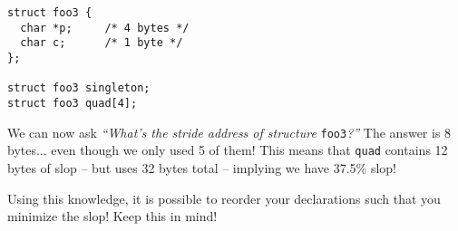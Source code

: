 \documentclass[10pt]{article}
\renewcommand{\#}{\raisebox{.22ex}{\large\old}}
\begin{document}
\begin{lstlisting}
struct foo3 {
  char *p;     /* 4 bytes */
  char c;      /* 1 byte */
};

struct foo3 singleton;
struct foo3 quad[4];
\end{lstlisting}

\noindent We can now ask \textit{``What's the stride address of structure} \texttt{foo3}\textit{?''} The answer is 8 bytes... even though we only used 5 of them! This means that \texttt{quad} contains 12 bytes of slop -- but uses 32 bytes total -- implying we have 37.5\% slop!

\noindent Using this knowledge, it is possible to reorder your declarations such that you minimize the slop! Keep this in mind!
\end{document}
